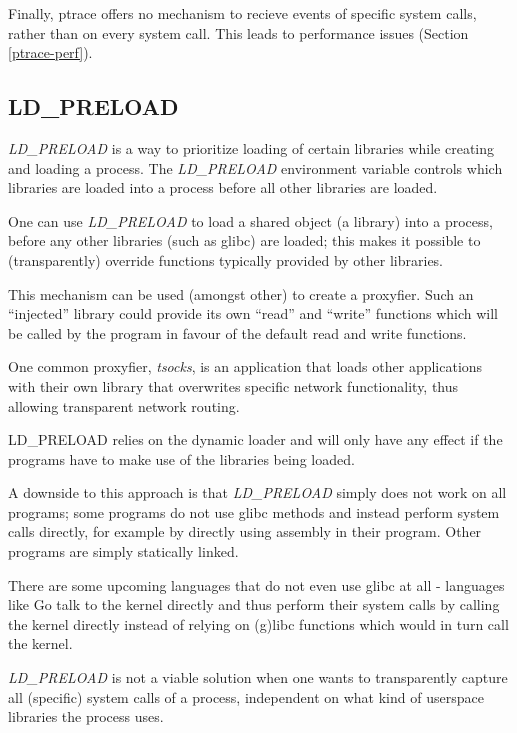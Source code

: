 \documentclass[a4paper, 10pt]{report}
\begin{document}
Finally, ptrace offers no mechanism to recieve events of specific system calls,
rather than on every system call. This leads to performance issues (Section
\ref{ptrace-perf}).

\subsection{LD\_PRELOAD}

\textit{LD\_PRELOAD} is a way to prioritize loading of certain libraries
while creating and loading a process. The \textit{LD\_PRELOAD} environment
variable controls which libraries are loaded into a process before all
other libraries are loaded.

One can use \textit{LD\_PRELOAD} to load a shared object (a library)
into a process, before any other libraries (such as glibc) are loaded;
this makes it possible to (transparently) override functions typically
provided by other libraries.

This mechanism can be used (amongst other) to create a proxyfier.
Such an ``injected'' library could provide its own ``read'' and
``write'' functions which will be called by the program in favour of
the default read and write functions.

One common proxyfier, \textit{tsocks}, is an application that loads
other applications with their own library that overwrites specific
network functionality, thus allowing transparent network routing.

LD\_PRELOAD relies on the dynamic loader and will only have any effect
if the programs have to make use of the libraries being loaded.

A downside to this approach is that \textit{LD\_PRELOAD} simply does not work
on all programs; some programs do not use glibc methods and instead perform
system calls directly, for example by directly using assembly in their program.
Other programs are simply statically linked. %

There are some upcoming languages that do not even use glibc at all - languages
like Go \cite{golang} talk to the kernel directly and thus perform their
system calls by calling the kernel directly instead of
relying on (g)libc functions which would in turn call the kernel.

\textit{LD\_PRELOAD} is not a viable solution when one wants to transparently capture
all (specific) system calls of a process, independent on what kind of
userspace libraries the process uses.
\end{document}

